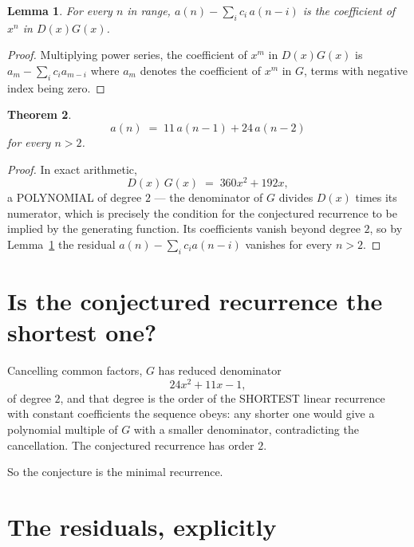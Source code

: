 \documentclass[11pt,a4paper]{article}
\theoremstyle{plain}
\newtheorem{theorem}{Theorem}
\newtheorem{lemma}[theorem]{Lemma}
\theoremstyle{definition}
\begin{document}
\begin{lemma}\label{lem:key}
For every $n$ in range, $a(n)-\sum_i c_i\,a(n-i)$ is the coefficient of $x^{n}$ in
$D(x)G(x)$.
\end{lemma}

\begin{proof}
Multiplying power series, the coefficient of $x^{m}$ in $D(x)G(x)$ is
$a_m-\sum_i c_i a_{m-i}$ where $a_m$ denotes the coefficient of $x^{m}$ in $G$, terms with
negative index being zero.
\end{proof}

\begin{theorem}
\[
a(n)\;=\;11\,a(n-1) + 24\,a(n-2)
\]
for every $n>2$.
\end{theorem}

\begin{proof}
In exact arithmetic,
\[
D(x)\,G(x)\;=\;360 x^{2} + 192 x,
\]
a POLYNOMIAL of degree $2$ --- the denominator of $G$ divides $D(x)$ times its numerator,
which is precisely the condition for the conjectured recurrence to be implied by the
generating function. Its coefficients vanish beyond degree $2$, so by
Lemma~\ref{lem:key} the residual $a(n)-\sum_ic_ia(n-i)$ vanishes for every
$n>2$.
\end{proof}

\section{Is the conjectured recurrence the shortest one?}

Cancelling common factors, $G$ has reduced denominator
\[
24 x^{2} + 11 x - 1,
\]
of degree $2$, and that degree is the order of the SHORTEST linear recurrence with
constant coefficients the sequence obeys: any shorter one would give a polynomial multiple of
$G$ with a smaller denominator, contradicting the cancellation. The conjectured recurrence has
order $2$.

So the conjecture is the minimal recurrence.

\section{The residuals, explicitly}
\end{document}
